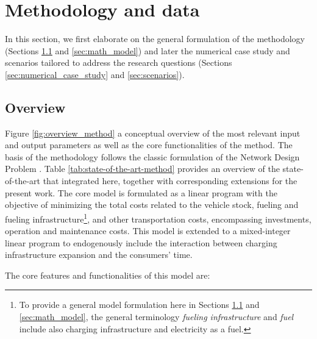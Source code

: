 \documentclass[preprint,review,11pt, authoryear]{elsarticle}
\begin{document}
\section{Methodology and data}
    
    In this section, we first elaborate on the general formulation of the methodology (Sections \ref{sec:overview} and \ref{sec:math_model}) and later\deleted{,} the numerical case study and scenarios tailored to address the research questions (Sections \ref{sec:numerical_case_study} and \ref{sec:scenarios}).
    
    \subsection{Overview} \label{sec:overview}
    Figure \ref{fig:overview_method}  a conceptual overview of the most relevant input and output parameters as well as the core functionalities of the method. The basis of the methodology follows the classic formulation of the Network Design Problem \citep{Yang01071998}. Table \ref{tab:state-of-the-art-method} provides an overview of the state-of-the-art  that  integrated here, together with corresponding extensions for the present work. The core model is formulated as a linear program with the objective of minimizing the total costs related to the vehicle stock, fueling\added{,} and fueling infrastructure\footnote{To provide a general model formulation here in Sections \ref{sec:overview} and \ref{sec:math_model}, the general terminology \textit{fueling infrastructure} and \textit{fuel} include also charging infrastructure and electricity as a fuel.}, and other transportation costs, encompassing investments, operation and maintenance costs. This model is extended to a mixed-integer linear program to endogenously include the interaction between charging infrastructure expansion and the consumers'  time.
    
    The core features and functionalities of this model are:
    
\end{document}
